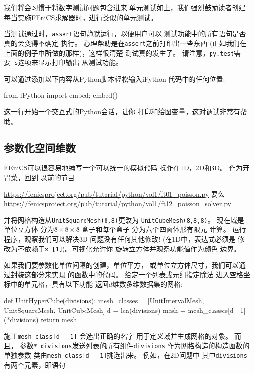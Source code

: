 我们将会习惯于将数字测试问题包含进来
单元测试如上，我们强烈鼓励读者创建
每当实施FEniCS求解器时，进行类似的单元测试。

\begin{notice}[提示:在测试功能中打印消息]
当测试通过时，\texttt{assert}语句静默运行，以便用户可以
测试功能中的所有语句是否真的会变得不确定
执行。 心理帮助是在\texttt{assert}之前打印出一些东西
(正如我们在上面的例子中所做的那样)，这样很清楚
测试真的发生了。
请注意，\texttt{py.test}需要\texttt{-s}选项来显示打印输出
从测试功能。
\end{notice}

\begin{notice}[提示:使用iPython进行调试]
可以通过添加以下内容从Python脚本轻松输入iPython
代码中的任何位置:
\begin{python}
from IPython import embed; embed()
\end{python}
这一行开始一个交互式的Python会话，让你
打印和绘图变量，这对调试非常有帮助。
\end{notice}

\subsection{参数化空间维数}
\label{ch:poisson0:nD}


FEniCS可以很容易地编写一个可以统一的模拟代码
操作在1D，2D和3D。 作为开胃菜，回到
以前的节目
\begin{center}
\url{https://fenicsproject.org/pub/tutorial/python/vol1/ft01_poisson.py}
要么
\url{https://fenicsproject.org/pub/tutorial/python/vol1/ft12_poisson_solver.py}
\end{center}
并将网格构造从\texttt{UnitSquareMesh(8,8)}更改为
\texttt{UnitCubeMesh(8,8,8)}。 现在域是单位立方体
分为$8\times 8\times 8$
盒子和每个盒子
分为六个四面体形有限元
计算。 运行程序，观察我们可以解决3D
问题没有任何其他修改! (在1D中，表达式必须是
修改为不依赖于\texttt{x [1]})。可视化允许你
旋转立方体并观察功能值作为颜色
边界。

如果我们要参数化单位间隔的创建，单位平方，
或单位立方体尺寸，我们可以通过封装这部分来实现
的函数中的代码。 给定一个列表或元组指定除法
进入空格坐标中的单元格，具有以下功能
返回$d$维数多维数据集的网格:

\begin{python}
def UnitHyperCube(divisions):
    mesh_classes = [UnitIntervalMesh, UnitSquareMesh, UnitCubeMesh]
    d = len(divisions)
    mesh = mesh_classes[d - 1](*divisions)
    return mesh
\end{python}
施工\verb!mesh_class[d - 1]! 会选出正确的名字
用于定义域并生成网格的对象。 而且，
参数\texttt{* divisions}发送列表的所有组件\texttt{divisions}
作为网格构造的构造函数的单独参数
类由\verb!mesh_class[d - 1]!挑选出来。 例如，在2D问题中
其中\texttt{divisions}有两个元素，即语句

